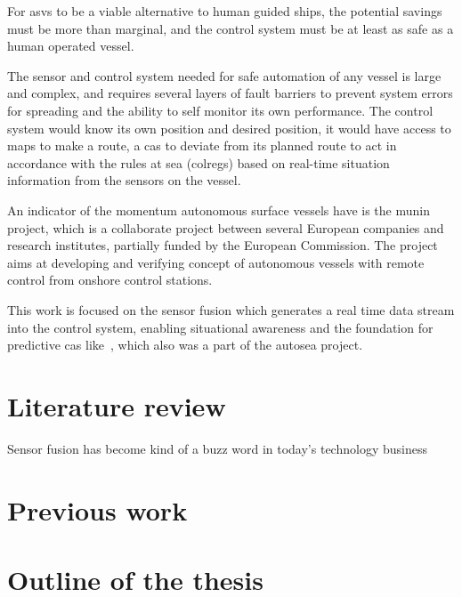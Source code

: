 For \glspl{asv} to be a viable alternative to human guided ships, the potential savings must be more than marginal, and the control system must be at least as safe as a human operated vessel. 

The sensor and control system needed for safe automation of any vessel is large and complex, and requires several layers of fault barriers to prevent system errors for spreading and the ability to self monitor its own performance. The control system would know its own position and desired position, it would have access to maps to make a route, a \gls{cas} to deviate from its planned route to act in accordance with the rules at sea (\gls{colregs}) based on real-time situation information from the sensors on the vessel.


An indicator of the momentum autonomous surface vessels have is the \gls{munin} project, which is a collaborate project between several European companies and research institutes, partially funded by the European Commission. The project aims at developing and verifying concept of autonomous vessels with remote control from onshore control stations.

This work is focused on the sensor fusion which generates a real time data stream into the control system, enabling situational awareness and the foundation for predictive \gls{cas} like~\cite{Hagen2017}, which also was a part of the \gls{autosea} project.

\section{Literature review}
Sensor fusion has become kind of a buzz word in today's technology business  

\cite{Habtemariam2015}


\section{Previous work}

\section{Outline of the thesis}
